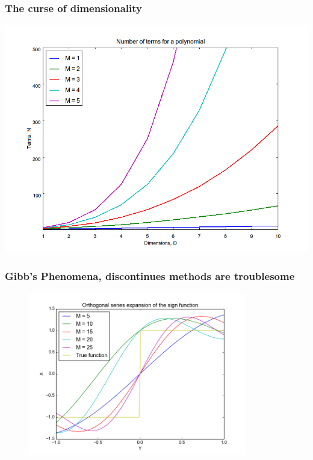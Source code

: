 \documentclass[handout]{beamer}
\begin{document}
 
 
 
 
 
 

\begin{frame}
  \frametitle{The curse of dimensionality}
  \includegraphics[height = 0.85\textheight]{dimensionality.png}

\end{frame}


\begin{frame}
  \frametitle{Gibb's Phenomena, discontinues methods are troublesome}
  \begin{figure}
  \includegraphics[width=0.85\textwidth]{gibbs.png}
  \end{figure}

  \end{frame}
\end{document}
